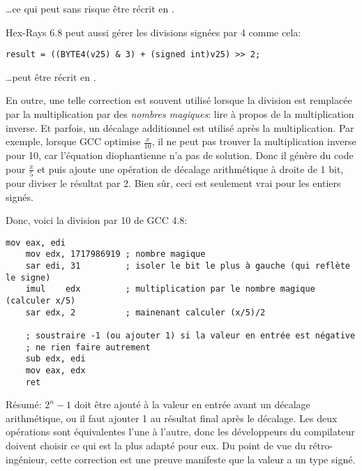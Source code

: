\dots ce qui peut sans risque être récrit en .

Hex-Rays 6.8 peut aussi gérer les divisions signées par 4 comme cela:

\begin{lstlisting}
result = ((BYTE4(v25) & 3) + (signed int)v25) >> 2;
\end{lstlisting}

\dots peut être récrit en .

\myhrule{}

En outre, une telle correction est souvent utilisé lorsque la division est remplacée
par la multiplication par des \textit{nombres magiques}:
lire \MathForProg à propos de la multiplication inverse.
Et parfois, un décalage additionnel est utilisé après la multiplication.
Par exemple, lorsque GCC optimise $\frac{x}{10}$, il ne peut pas trouver la multiplication
inverse pour 10, car l'équation diophantienne n'a pas de solution.
Donc il génère du code pour $\frac{x}{5}$ et puis ajoute une opération de décalage
arithmétique à droite de 1 bit, pour diviser le résultat par 2.
Bien sûr, ceci est seulement vrai pour les entiers signés.

Donc, voici la division par 10 de GCC 4.8:

\begin{lstlisting}[style=customasmx86]
	mov	eax, edi
	mov	edx, 1717986919 ; nombre magique
	sar	edi, 31         ; isoler le bit le plus à gauche (qui reflète le signe)
	imul	edx         ; multiplication par le nombre magique (calculer x/5)
	sar	edx, 2          ; mainenant calculer (x/5)/2

    ; soustraire -1 (ou ajouter 1) si la valeur en entrée est négative
	; ne rien faire autrement
	sub	edx, edi        
	mov	eax, edx
	ret
\end{lstlisting}

Résumé: $2^n-1$ doit être ajouté à la valeur en entrée avant un décalage arithmétique,
ou il faut ajouter 1 au résultat final après le décalage.
Les deux opérations sont équivalentes l'une à l'autre, donc les développeurs du
compilateur doivent choisir ce qui est la plus adapté pour eux.
Du point de vue du rétro-ingénieur, cette correction est une preuve manifeste que
la valeur a un type signé.

